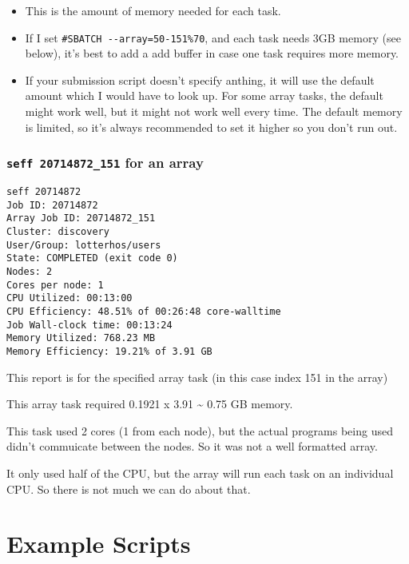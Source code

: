 \documentclass[
  letterpaper,
  DIV=11,
  numbers=noendperiod]{scrreprt}
\begin{document}
\begin{itemize}
\item
  This is the amount of memory needed for each task.
\item
  If I set \texttt{\#SBATCH\ -\/-array=50-151\%70}, and each task needs
  3GB memory (see below), it's best to add a add buffer in case one task
  requires more memory.
\item
  If your submission script doesn't specify anthing, it will use the
  default amount which I would have to look up. For some array tasks,
  the default might work well, but it might not work well every time.
  The default memory is limited, so it's always recommended to set it
  higher so you don't run out.
\end{itemize}

\hypertarget{seff-20714872_151-for-an-array}{%
\subsection*{\texorpdfstring{\textbf{\texttt{seff\ 20714872\_151} for an
array}}{seff 20714872\_151 for an array}}\label{seff-20714872_151-for-an-array}}

\begin{verbatim}
seff 20714872
Job ID: 20714872
Array Job ID: 20714872_151
Cluster: discovery
User/Group: lotterhos/users
State: COMPLETED (exit code 0)
Nodes: 2
Cores per node: 1
CPU Utilized: 00:13:00
CPU Efficiency: 48.51% of 00:26:48 core-walltime
Job Wall-clock time: 00:13:24
Memory Utilized: 768.23 MB
Memory Efficiency: 19.21% of 3.91 GB
\end{verbatim}

This report is for the specified array task (in this case index 151 in
the array)

This array task required 0.1921 x 3.91 \textasciitilde{} 0.75 GB memory.

This task used 2 cores (1 from each node), but the actual programs being
used didn't commuicate between the nodes. So it was not a well formatted
array.

It only used half of the CPU, but the array will run each task on an
individual CPU. So there is not much we can do about that.

\hypertarget{example-scripts}{%
\chapter{Example Scripts}\label{example-scripts}}
\end{document}
